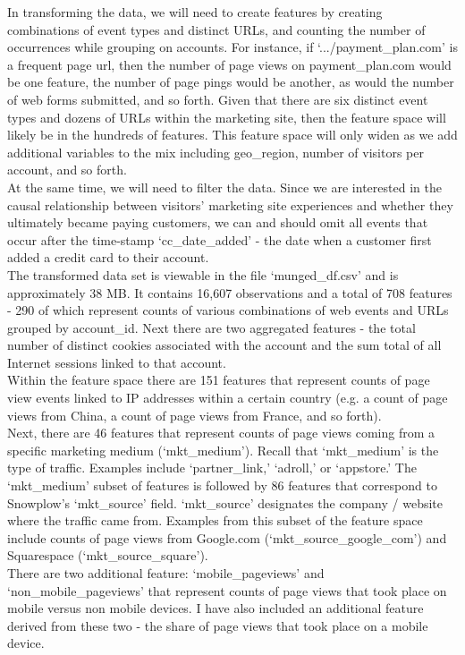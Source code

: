 \documentclass{article} %
\begin{document}
\indent In transforming the data, we will need to create features by creating combinations of event types and distinct URLs, and counting the number of occurrences while grouping on accounts. For instance, if `.../payment\_plan.com' is a frequent page url, then the number of page views on payment\_plan.com would be one feature, the number of page pings would be another, as would the number of web forms submitted, and so forth. Given that there are six distinct event types and dozens of URLs within the marketing site, then the feature space will likely be in the hundreds of features. This feature space will only widen as we add additional variables to the mix including geo\_region, number of visitors per account, and so forth.\\
\indent At the same time, we will need to filter the data. Since we are interested in the causal relationship between visitors' marketing site experiences and whether they ultimately became paying customers, we can and should omit all events that occur after the time-stamp `cc\_date\_added' - the date when a customer first added a credit card to their account.\\
\indent The transformed data set is viewable in the file `munged\_df.csv' and is approximately 38 MB. It contains 16,607 observations and a total of 708 features - 290 of which represent counts of various combinations of web events and URLs grouped by account\_id. Next there are two aggregated features - the total number of distinct cookies associated with the account and the sum total of all Internet sessions linked to that account.\\
\indent Within the feature space there are 151 features that represent counts of page view events linked to IP addresses within a certain country (e.g. a count of page views from China, a count of page views from France, and so forth). \\
\indent Next, there are 46 features that represent counts of page views coming from a specific marketing medium (`mkt\_medium'). Recall that `mkt\_medium' is the type of traffic. Examples include `partner\_link,' `adroll,' or `appstore.' The `mkt\_medium' subset of features is followed by 86 features that correspond to Snowplow's `mkt\_source' field. `mkt\_source' designates the company / website where the traffic came from. Examples from this subset of the feature space include counts of page views from Google.com (`mkt\_source\_google\_com') and Squarespace (`mkt\_source\_square').\\
\indent There are two additional feature: `mobile\_pageviews' and `non\_mobile\_pageviews' that represent counts of page views that took place on mobile versus non mobile devices. I have also included an additional feature derived from these two - the share of page views that took place on a mobile device. \\
\end{document}
